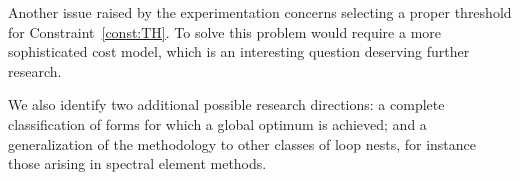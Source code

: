 Another issue raised by the experimentation concerns selecting a proper threshold for Constraint~\ref{const:TH}. To solve this problem would require a more sophisticated cost model, which is an interesting question deserving further research. 

We also identify two additional possible research directions: a complete classification of forms for which a global optimum is achieved; and a generalization of the methodology to other classes of loop nests, for instance those arising in spectral element methods.










%
%
%
%
